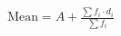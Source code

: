 \documentclass[preview]{standalone}
\begin{document}
\begin{align*}
\text{Mean} = A + \frac{\sum f_i \cdot d_i}{\sum f_i}
\end{align*}
\end{document}
